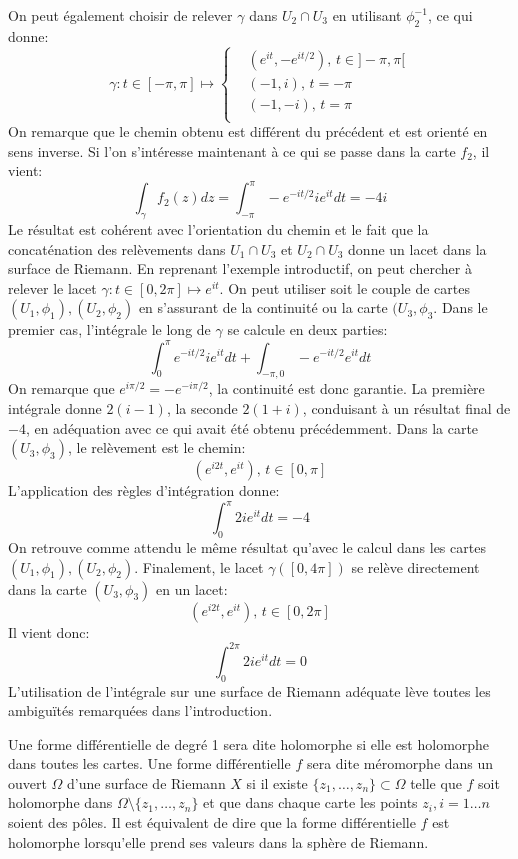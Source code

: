 On peut également choisir de relever $\gamma$ dans $U_2 \cap U_3$ en utilisant $\phi_2^{-1}$, ce qui donne:
\[
\gamma \colon t \in [-\pi,\pi] \mapsto
\begin{cases}
&\left(e^{it},-e^{i t /2}\right), \, t \in ]-\pi,\pi[ \\
& (-1,i) , \, t = -\pi \\
& (-1,-i),  \, t = \pi \\
\end{cases}
\]
On remarque que le chemin obtenu est différent du précédent et est orienté en sens inverse. 
Si l'on s'intéresse maintenant à ce qui se passe dans la carte $f_2$, il vient:
\[
\int_\gamma f_2(z)dz = \int_{-\pi}^{\pi} -e^{-it/2} i e^{it} dt = -4i
\]
Le résultat est cohérent avec l'orientation du chemin et le fait que la concaténation des relèvements dans $U_1\cap U_3$ et $U_2 \cap U_3$ donne un lacet dans la surface de Riemann. 
En reprenant l'exemple introductif, on peut chercher à relever le lacet $\gamma \colon t \in [0, 2\pi] \mapsto e^{it}$. On peut utiliser soit le couple de cartes $(U_1,\phi_1),(U_2,\phi_2)$ en s'assurant de la continuité ou la carte $(U_3,\phi_3$. Dans le premier cas, l'intégrale le long de $\gamma$ se calcule en deux parties:
\[
\int_0^\pi e^{-it/2}i e^{it}dt + \int_{-\pi,0} -e^{-it/2}e^{it} dt
\]
On remarque que $e^{i\pi/2}=-e^{-i\pi/2}$, la continuité est donc garantie. La première intégrale donne $2(i-1)$, la seconde $2(1+i)$, conduisant à un résultat final de $-4$, en adéquation avec ce qui avait été obtenu précédemment. 
Dans la carte $(U_3,\phi_3)$, le relèvement est le chemin:
\[
(e^{i2t},e^{it}), \, t \in [0, \pi]
\]
L'application des règles d'intégration donne:
\[
\int_0^\pi 2 i e^{it} dt = -4
\]
On retrouve comme attendu le même résultat qu'avec le calcul dans les cartes $(U_1,\phi_1),(U_2,\phi_2)$.
Finalement, le lacet $\gamma ([0, 4\pi])$ se relève directement dans la carte $(U_3,\phi_3)$ en un lacet:
\[
(e^{i2t},e^{it}), \, t \in [0, 2\pi]
\]
Il vient donc:
\[
\int_0^{2\pi} 2 i e^{it} dt = 0
\]
L'utilisation de l'intégrale sur une surface de Riemann adéquate lève toutes les ambiguïtés remarquées dans l'introduction. 
\begin{defn}
Une forme différentielle de degré 1 sera dite holomorphe si elle est holomorphe dans toutes les cartes. Une forme différentielle $f$ sera dite méromorphe dans un ouvert $\Omega$ d'une surface de Riemann $X$ si il existe $\{z_1,\dots,z_n\} \subset \Omega$ telle que $f$ soit holomorphe dans $\Omega \setminus \{z_1,\dots,z_n\}$ et que dans chaque carte les points $z_i,i=1\dots n$ soient des pôles. Il est équivalent de dire que la forme différentielle $f$ est holomorphe lorsqu'elle prend ses valeurs dans la sphère de Riemann. 
\end{defn}
